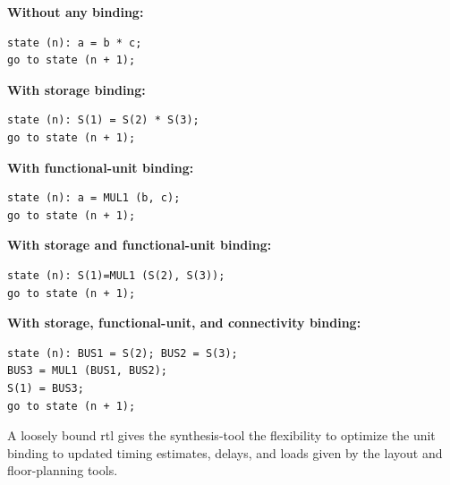 \begin{minipage}[t][300px]{\textwidth}
\textbf{Without any binding:}%
\begin{verbatim}
state (n): a = b * c;
go to state (n + 1);
\end{verbatim}
\textbf{With storage binding:}%
\begin{verbatim}
state (n): S(1) = S(2) * S(3);
go to state (n + 1);
\end{verbatim}
\textbf{With functional-unit binding:}%
\begin{verbatim}
state (n): a = MUL1 (b, c);
go to state (n + 1);
\end{verbatim}
\textbf{With storage and functional-unit binding:}%
\begin{verbatim}
state (n): S(1)=MUL1 (S(2), S(3));
go to state (n + 1);
\end{verbatim}
\textbf{With storage, functional-unit, and connectivity binding:}%
\begin{verbatim}
state (n): BUS1 = S(2); BUS2 = S(3);
BUS3 = MUL1 (BUS1, BUS2);
S(1) = BUS3;
go to state (n + 1);
\end{verbatim}
\end{minipage}

A loosely bound \gls{rtl} gives the synthesis-tool the flexibility to optimize the unit binding to updated timing estimates, delays, and loads given by the layout and floor-planning tools.

